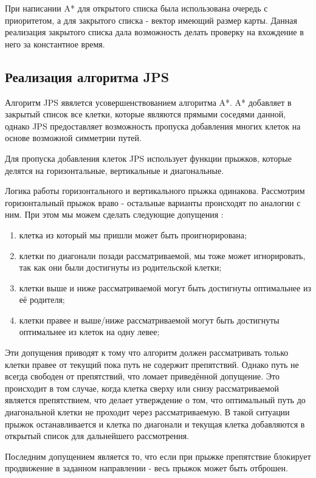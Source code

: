 При написании A* для открытого списка была использована очередь с приоритетом, а для закрытого списка - вектор имеющий размер карты. Данная реализация закрытого списка дала возможность делать проверку на вхождение в него за константное время.

\subsection{Реализация алгоритма JPS}

Алгоритм JPS явялется усовершенствованием алгоритма A*. A* добавляет в закрытый список все клетки, которые являются прямыми соседями данной, однако JPS предоставляет возможность пропуска добавления многих клеток на основе возможной симметрии путей.

Для пропуска добавления клеток JPS использует функции прыжков, которые делятся на горизонтальные, вертикальные и диагональные.

Логика работы горизонтального и вертикального прыжка одинакова. Рассмотрим горизонтальный прыжок враво - остальные варианты происходят по аналогии с ним. При этом мы можем сделать следующие допущения \cite{JPS_DETAILS}:

\begin{enumerate}
    \item клетка из который мы пришли может быть проигнорирована;
    \item клетки по диагонали позади рассматриваемой, мы тоже может игнорировать, так как они были достигнуты из родительской клетки;
    \item клетки выше и ниже рассматриваемой могут быть достигнуты оптимальнее из её родителя;
    \item клетки правее и выше/ниже рассматриваемой могут быть достигнуты оптимальнее из клеток на одну левее;
\end{enumerate}

Эти допущения приводят к тому что алгоритм должен рассматривать только клетки правее от текущий пока путь не содержит препятствий. Однако путь не всегда свободен от препятствий, что ломает приведённой допущение. Это происходит в том случае, когда клетка сверху или снизу рассматриваемой является препятствием, что делает утверждение о том, что оптимальный путь до диагональной клетки не проходит через рассматриваемую. В такой ситуации прыжок останавливается и клетка по диагонали и текущая клетка добавляются в открытый список для дальнейшего рассмотрения. 

Последним допущением является то, что если при прыжке препятствие блокирует продвижение в заданном направлении - весь прыжок может быть отброшен.

